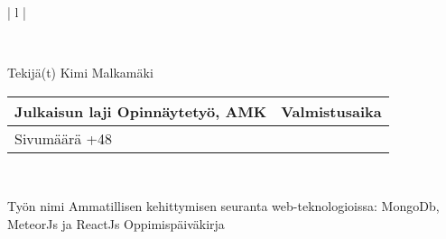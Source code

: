 
\begin{tabular}{ | l | }

    \\

    \hline
    \begin{minipage}[b]{6cm}
        Tekijä(t)
        \newline
        Kimi Malkamäki 
    \end{minipage}%
    \begin{minipage}{8.5cm}
        \begin{tabular}{ | l | c | }
            \begin{minipage}[t][1cm][t]{4.25cm}
                Julkaisun laji
                \newline
                Opinnäytetyö, AMK
            \end{minipage} & %
            \begin{minipage}{3.6cm}
                Valmistusaika
                \newline
                2024
            \end{minipage} \\ \hline%
            \begin{minipage}[t][1.01cm][t]{4.25cm}
                Sivumäärä
                \newline 
                31+48
            \end{minipage}
            &  \\ \hline
        \end{tabular}
    \end{minipage}%
      \\ \hline

    \begin{minipage}[t][2cm][t]{14cm}
    Työn nimi 
        \newline 
        Ammatillisen kehittymisen seuranta web-teknologioissa: MongoDb, MeteorJs ja ReactJs   
        \Oewline 
    Oppimispäiväkirja  
    \end{minipage}\\ \hline


\end{tabular}

